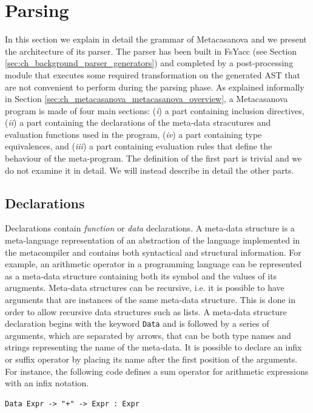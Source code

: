 \section{Parsing}
\label{sec:ch_metacasanova_parsing}
In this section we explain in detail the grammar of Metacasanova and we present the architecture of its parser. The parser has been built in FsYacc (see Section \ref{sec:ch_background_parser_generators}) and completed by a post-processing module that executes some required transformation on the generated AST that are not convenient to perform during the parsing phase. As explained informally in Section \ref{sec:ch_metacasanova_metacasanova_overview}, a Metacasanova program is made of four main sections: (\textit{i}) a part containing inclusion directives, (\textit{ii}) a part containing the declarations of the meta-data stracutures and evaluation functions used in the program, (\textit{iv}) a part containing type equivalences, and (\textit{iii}) a part containing evaluation rules that define the behaviour of the meta-program. The definition of the first part is trivial and we do not examine it in detail. We will instead describe in detail the other parts.
	
\subsection{Declarations}
\label{sec:ch_metacasanova_parser_declarations}
Declarations contain \textit{function} or \textit{data} declarations. A meta-data structure is a meta-language representation of an abstraction of the language implemented in the metacompiler and contains both syntactical and structural information. For example, an arithmetic operator in a programming language can be represented as a meta-data structure containing both its symbol and the values of its arugments. Meta-data structures can be recursive, i.e. it is possible to have arguments that are instances of the same meta-data structure. This is done in order to allow recursive data structures such as lists. A meta-data structure declaration begins with the keyword \texttt{Data} and is followed by a series of arguments, which are separated by arrows, that can be both type names and strings representing the name of the meta-data. It is possible to declare an infix or suffix operator by placing its name after the first position of the arguments. For instance, the following code defines a sum operator for arithmetic expressions with an infix notation.

\begin{lstlisting}
Data Expr -> "+" -> Expr : Expr
\end{lstlisting}

